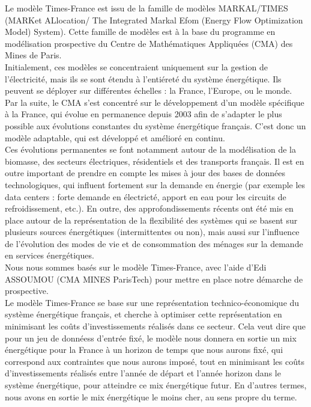 \documentclass{article}
\theoremstyle{nopointbreak}
\theoremstyle{nobrkbold}
\begin{document}
Le modèle Times-France est issu de la famille de modèles  MARKAL/TIMES (MARKet ALlocation/ The Integrated Markal Efom (Energy Flow Optimization Model) System). Cette famille de modèles est à la base du programme en modélisation prospective du Centre de Mathématiques Appliquées (CMA) des Mines de Paris. \\
Initialement, ces modèles se concentraient uniquement sur la gestion de l'électricité, mais ils se sont étendu à l'entiéreté du système énergétique. 
 Ils peuvent se déployer sur différentes échelles : la France, l'Europe, ou le monde. Par la suite, le CMA s'est concentré sur le développement d'un modèle spécifique à la France, qui évolue en permanence depuis 2003 afin de s'adapter le plus possible aux évolutions constantes du système énergétique français. C'est donc un modèle adaptable, qui est développé et amélioré en continu. \\
 Ces évolutions permanentes se font notamment autour de la modélisation de la biomasse, des secteurs électriques, résidentiels et des transports français. Il est en outre important de prendre en compte les mises à jour des bases de données technologiques, qui influent fortement sur la demande en énergie (par exemple les data centers : forte demande en électricté, apport en eau pour les circuits de refroidissement, etc.). En outre, des approfondissements récents ont été mis en place autour de la représentation de la flexibilité des systèmes qui se basent sur plusieurs sources énergétiques (intermittentes ou non), mais aussi sur l'influence de l'évolution des modes de vie et de consommation des ménages sur la demande en services énergétiques. \\

 Nous nous sommes basés sur le modèle Times-France, avec l'aide d'Edi ASSOUMOU (CMA MINES ParisTech) pour mettre en place notre démarche de prospective. \\
 Le modèle Times-France se base sur une représentation technico-économique du système énergétique français, et cherche à optimiser cette représentation en minimisant les coûts d'investissements réalisés dans ce secteur. Cela veut dire que pour un jeu de donnéess d'entrée fixé, le modèle nous donnera en sortie un mix énergétique pour la France à un horizon de temps que nous aurons fixé, qui correspond aux contraintes que nous aurons imposé, tout en minimisant les coûts d'investissements réalisés entre l'année de départ et l'année horizon dans le système énergétique, pour atteindre ce mix énergétique futur. En d'autres termes, nous avons en sortie le mix énergétique le moins cher, au sens propre du terme. \\
\end{document}
